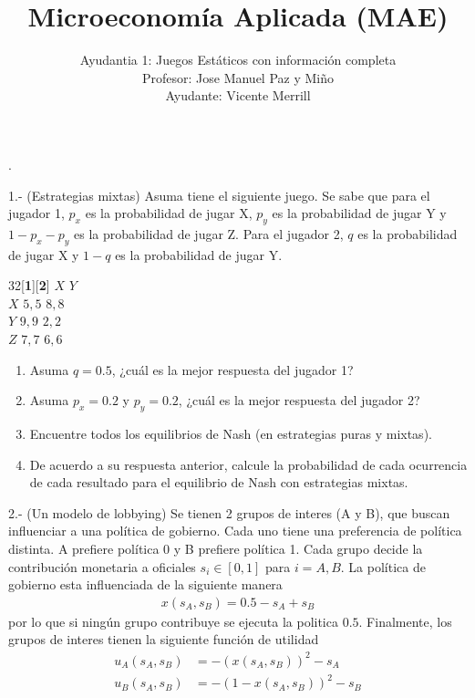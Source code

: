 \documentclass[11pt]{article}
\title{Microeconom\'ia Aplicada (MAE)}
\author{Ayudantia 1: Juegos Est\'aticos con informaci\'on completa \\ Profesor: Jose Manuel Paz y Mi\~no \\ Ayudante: Vicente Merrill}
\date{}
\newcommand{\blankline}{\quad\pagebreak[2]}
\begin{document}
\maketitle

\blankline

\setlength{\parindent}{0pt}.

1.- (Estrategias mixtas) Asuma tiene el siguiente juego. Se sabe que para el jugador 1, $p_{x}$ es la probabilidad de jugar X, $p_{y}$ es la probabilidad de jugar Y y $1-p_{x}-p_{y}$ es la probabilidad de jugar Z. Para el jugador 2, $q$ es la probabilidad de jugar X y $1-q$ es la probabilidad de jugar Y.

\begin{center}
	 \begin{game}{3}{2}[\textbf{1}][\textbf{2}]
                  \>$X$         \>$Y$\\
        $X$       \>$5,5$       \>$8,8$\\
        $Y$       \>$9,9$       \>$2,2$\\
        $Z$       \>$7,7$       \>$6,6$
 \end{game}
\end{center}

\begin{enumerate}
	\item Asuma $q=0.5$, ¿cu\'al es la mejor respuesta del jugador 1?
	\item Asuma $p_{x} = 0.2$ y $p_{y} = 0.2$, ¿cu\'al es la mejor respuesta del jugador 2?
	\item Encuentre todos los equilibrios de Nash (en estrategias puras y mixtas). 
	\item De acuerdo a su respuesta anterior, calcule la probabilidad de cada ocurrencia de cada resultado para el equilibrio de Nash con estrategias mixtas.
\end{enumerate}

2.- (Un modelo de lobbying) Se tienen 2 grupos de interes (A y B), que buscan influenciar a una pol\'itica de gobierno. Cada uno tiene una preferencia de pol\'itica distinta. A prefiere pol\'itica 0 y B prefiere pol\'itica 1. Cada grupo decide la contribuci\'on monetaria a oficiales $s_{i} \in [0,1]$ para $i=A,B$. La pol\'itica de gobierno esta influenciada de la siguiente manera
\begin{align*}
	x(s_{A},s_{B}) = 0.5 - s_{A} + s_{B}
\end{align*} por lo que si ning\'un grupo contribuye se ejecuta la politica $0.5$. Finalmente, los grupos de interes tienen la siguiente funci\'on de utilidad
\begin{align*}
	u_{A}(s_{A},s_{B}) &= -(x(s_{A},s_{B}))^{2} - s_{A} \\
	u_{B}(s_{A},s_{B}) &= -(1 - x(s_{A},s_{B}))^{2} - s_{B}
\end{align*}
\end{document}
